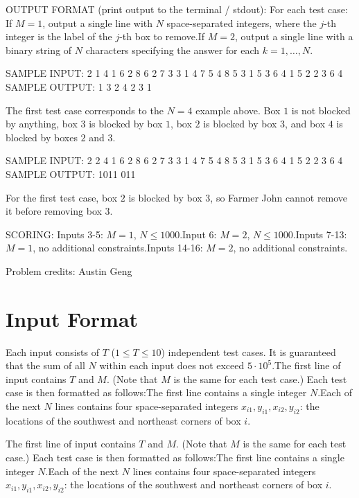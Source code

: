 \documentclass[12pt]{article}
\begin{document}
OUTPUT FORMAT (print output to the terminal / stdout):
For each test case:
If $M = 1$, output a single line with $N$ space-separated integers, where
the $j$-th integer is the label of the $j$-th box to remove.If
$M = 2$, output a single line with a binary string of $N$ characters specifying
the answer for each $k = 1, \dots, N$.

SAMPLE INPUT:
2 1
4
1 6 2 8
6 2 7 3
3 1 4 7
5 4 8 5
3
1 5 3 6
4 1 5 2
2 3 6 4
SAMPLE OUTPUT: 
1 3 2 4
2 3 1

The first test case corresponds to the $N = 4$ example above. Box $1$ is not
blocked by anything, box $3$ is blocked by box $1$, box $2$ is blocked by box
$3$, and box $4$ is blocked by boxes $2$ and $3$.

SAMPLE INPUT:
2 2
4
1 6 2 8
6 2 7 3
3 1 4 7
5 4 8 5
3
1 5 3 6
4 1 5 2
2 3 6 4
SAMPLE OUTPUT: 
1011
011

For the first test case, box $2$ is blocked by box $3$, so Farmer John cannot
remove it before removing box $3$.

SCORING:
Inputs 3-5: $M = 1$, $N\le 1000$.Input 6: $M = 2$,
$N \le 1000$.Inputs 7-13: $M = 1$, no additional constraints.Inputs 14-16: $M = 2$, no additional constraints.

Problem credits: Austin Geng



\section*{Input Format}
Each input consists of $T$ ($1 \le T \le 10$) independent test cases. It is
guaranteed that the sum of all $N$ within each input does not exceed
$5 \cdot 10^5$.The first line of input contains $T$ and $M$. (Note that $M$ is the same for
each test case.) Each test case is then formatted as follows:The first line contains a single integer $N$.Each of the next $N$
lines contains four space-separated integers $x_{i1}, y_{i1}, x_{i2}, y_{i2}$:
the locations of the southwest and northeast corners of box $i$.

The first line of input contains $T$ and $M$. (Note that $M$ is the same for
each test case.) Each test case is then formatted as follows:The first line contains a single integer $N$.Each of the next $N$
lines contains four space-separated integers $x_{i1}, y_{i1}, x_{i2}, y_{i2}$:
the locations of the southwest and northeast corners of box $i$.
\end{document}
